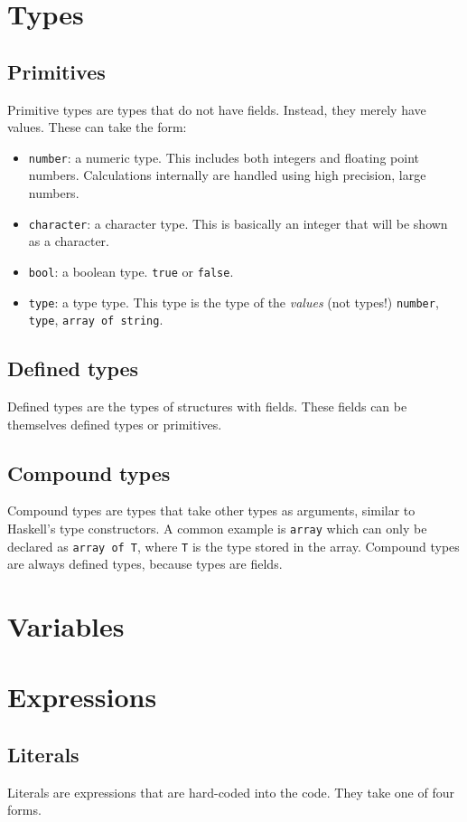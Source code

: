 \documentclass{article}
\newcommand{\code}[1]{\texttt{#1}}
\begin{document}
\section{Types}
\subsection{Primitives}
Primitive types are types that do not have fields. Instead, they merely have values. These can take the form:
\begin{itemize}
\item \code{number}: a numeric type. This includes both integers and floating point numbers. Calculations internally are handled using high precision, large numbers.
\item \code{character}: a character type. This is basically an integer that will be shown as a character.
\item \code{bool}: a boolean type. \code{true} or \code{false}.
\item \code{type}: a type type. This type is the type of the \emph{values} (not types!) \code{number}, \code{type}, \code{array of string}.
\end{itemize}
\subsection{Defined types}
Defined types are the types of structures with fields. These fields can be themselves defined types or primitives.
\subsection{Compound types}
Compound types are types that take other types as arguments, similar to Haskell's type constructors. A common example is \code{array} which can only be declared as \code{array of T}, where \code{T} is the type stored in the array. Compound types are always defined types, because types are fields.
\section{Variables}
\section{Expressions}
\subsection{Literals}
Literals are expressions that are hard-coded into the code. They take one of four forms.
\end{document}
